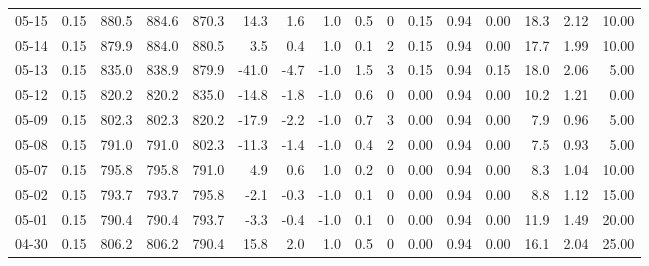\begin{threeparttable}
{\begin{tabular}{lrrrrrrrrrrrrrrr}
  05-15 &     0.15 & 880.5 & 884.6 & 870.3 &       14.3 &            1.6 &                      1.0 &                 0.5 &              0 &       0.15 &      0.94 &           0.00 &             18.3 &            2.12 &                  10.00 \\
  05-14 &     0.15 & 879.9 & 884.0 & 880.5 &        3.5 &            0.4 &                      1.0 &                 0.1 &              2 &       0.15 &      0.94 &           0.00 &             17.7 &            1.99 &                  10.00 \\
  05-13 &     0.15 & 835.0 & 838.9 & 879.9 &      -41.0 &           -4.7 &                     -1.0 &                 1.5 &              3 &       0.15 &      0.94 &           0.15 &             18.0 &            2.06 &                   5.00 \\
  05-12 &     0.15 & 820.2 & 820.2 & 835.0 &      -14.8 &           -1.8 &                     -1.0 &                 0.6 &              0 &       0.00 &      0.94 &           0.00 &             10.2 &            1.21 &                   0.00 \\
  05-09 &     0.15 & 802.3 & 802.3 & 820.2 &      -17.9 &           -2.2 &                     -1.0 &                 0.7 &              3 &       0.00 &      0.94 &           0.00 &              7.9 &            0.96 &                   5.00 \\
  05-08 &     0.15 & 791.0 & 791.0 & 802.3 &      -11.3 &           -1.4 &                     -1.0 &                 0.4 &              2 &       0.00 &      0.94 &           0.00 &              7.5 &            0.93 &                   5.00 \\
  05-07 &     0.15 & 795.8 & 795.8 & 791.0 &        4.9 &            0.6 &                      1.0 &                 0.2 &              0 &       0.00 &      0.94 &           0.00 &              8.3 &            1.04 &                  10.00 \\
  05-02 &     0.15 & 793.7 & 793.7 & 795.8 &       -2.1 &           -0.3 &                     -1.0 &                 0.1 &              0 &       0.00 &      0.94 &           0.00 &              8.8 &            1.12 &                  15.00 \\
  05-01 &     0.15 & 790.4 & 790.4 & 793.7 &       -3.3 &           -0.4 &                     -1.0 &                 0.1 &              0 &       0.00 &      0.94 &           0.00 &             11.9 &            1.49 &                  20.00 \\
  04-30 &     0.15 & 806.2 & 806.2 & 790.4 &       15.8 &            2.0 &                      1.0 &                 0.5 &              0 &       0.00 &      0.94 &           0.00 &             16.1 &            2.04 &                  25.00 \\

\end{tabular}}
\end{threeparttable}
